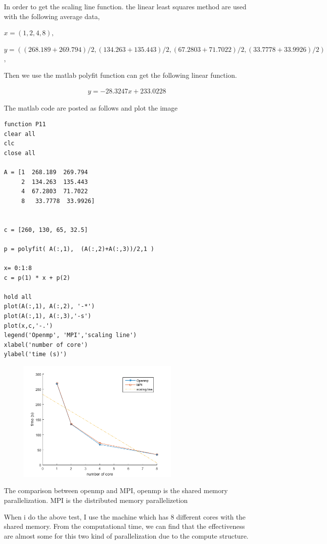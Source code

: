 \documentclass{article}
\begin{document}
In order to get the scaling line function.  the linear least squares method are used  with  the following  average data,

 $x = (1,2,4,8),$ 
 
 $y = ( (268.189 + 269.794)/2 , (134.263 + 135.443)/2,(67.2803 + 71.7022)/2, (33.7778+33.9926)/2)$, 

Then we use the matlab polyfit function can get the following linear function.

\begin{align}
  y = -28.3247x +   233.0228
\end{align}

The matlab code are posted as follows and plot the image

{\centering
{\tiny{\begin{verbatim}
function P11
clear all
clc
close all

A = [1  268.189  269.794
     2  134.263  135.443
     4  67.2803  71.7022
     8   33.7778  33.9926]


c = [260, 130, 65, 32.5]

p = polyfit( A(:,1),  (A(:,2)+A(:,3))/2,1 )

x= 0:1:8
c = p(1) * x + p(2)

hold all
plot(A(:,1), A(:,2), '-*')
plot(A(:,1), A(:,3),'-s')
plot(x,c,'-.')
legend('Openmp', 'MPI','scaling line')
xlabel('number of core')
ylabel('time (s)')
\end{verbatim}}}
}

\begin{figure}[H]
  \centering
  \includegraphics[width=8cm]{p11.png}
\end{figure}


The comparison between openmp and MPI,
openmp is the shared memory parallelization.
MPI is the distributed memory parallelizetion

When i do the above test, I use the machine which has 8 different cores with the shared memory.
From the computational time, we can find that the effectiveness are almost some for this two kind of parallelization due to the compute
structure.
\end{document}
